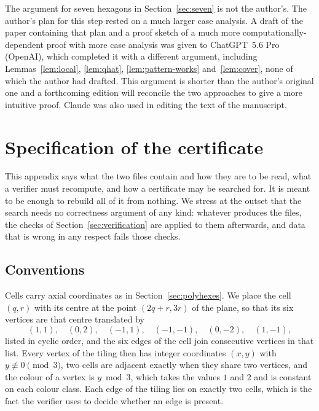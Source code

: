 \documentclass[11pt]{article}
\theoremstyle{definition}
\begin{document}
The argument for seven hexagons in Section~\ref{sec:seven} is not the
author's.  The author's plan for this step rested on a much larger case
analysis.  A draft of the paper containing that plan and a proof sketch of a much more computationally-dependent proof with more case analysis was given to ChatGPT~5.6
Pro (OpenAI), which completed it with a different argument, including Lemmas~\ref{lem:local}, \ref{lem:qhat}, \ref{lem:pattern-works}
and~\ref{lem:cover}, none of which the author had drafted.  This argument
is shorter than the author's original one and a forthcoming edition will reconcile the two approaches to give a more intuitive proof.
Claude was also used in editing the text of the manuscript.



\appendix

\section{Specification of the certificate}\label{app:spec}

This appendix says what the two files contain and how they are to be read,
what a verifier must recompute, and how a certificate may be searched for.
It is meant to be enough to rebuild all of it from nothing.  We stress at the
outset that the search needs no correctness argument of any kind: whatever
produces the files, the checks of Section~\ref{sec:verification} are applied
to them afterwards, and data that is wrong in any respect fails those checks.

\subsection{Conventions}

Cells carry axial coordinates as in Section~\ref{sec:polyhexes}.  We place the
cell $(q,r)$ with its centre at the point $(2q+r,3r)$ of the plane, so that
its six vertices are that centre translated by
\[
 (1,1),\quad(0,2),\quad(-1,1),\quad(-1,-1),\quad(0,-2),\quad(1,-1),
\]
listed in cyclic order, and the six edges of the cell join consecutive
vertices in that list.  Every vertex of the tiling then has integer
coordinates $(x,y)$ with $y\not\equiv0\pmod 3$, two cells are adjacent exactly
when they share two vertices, and the colour of a vertex is $y\bmod3$, which
takes the values $1$ and $2$ and is constant on each colour class.  Each edge
of the tiling lies on exactly two cells, which is the fact the verifier uses
to decide whether an edge is present.
\end{document}
